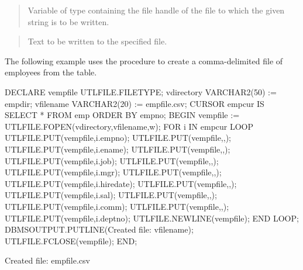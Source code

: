 \documentclass[letterpaper,10pt,english,openany,oneside]{sphinxmanual}
\begin{document}

\begin{quote}

Variable of type  containing the file handle of the file to
which the given string is to be written.
\end{quote}

\begin{quote}

Text to be written to the specified file.
\end{quote}

\newpage


The following example uses the  procedure to create a comma-delimited
file of employees from the  table.

%
\begin{sphinxVerbatim}[commandchars=\\\{\}]
DECLARE
    v\PYGZus{}empfile       UTL\PYGZus{}FILE.FILE\PYGZus{}TYPE;
    v\PYGZus{}directory     VARCHAR2(50) := \PYGZsq{}empdir\PYGZsq{};
    v\PYGZus{}filename      VARCHAR2(20) := \PYGZsq{}empfile.csv\PYGZsq{};
    CURSOR emp\PYGZus{}cur IS SELECT * FROM emp ORDER BY empno;
BEGIN
    v\PYGZus{}empfile := UTL\PYGZus{}FILE.FOPEN(v\PYGZus{}directory,v\PYGZus{}filename,\PYGZsq{}w\PYGZsq{});
    FOR i IN emp\PYGZus{}cur LOOP
        UTL\PYGZus{}FILE.PUT(v\PYGZus{}empfile,i.empno);
        UTL\PYGZus{}FILE.PUT(v\PYGZus{}empfile,\PYGZsq{},\PYGZsq{});
        UTL\PYGZus{}FILE.PUT(v\PYGZus{}empfile,i.ename);
        UTL\PYGZus{}FILE.PUT(v\PYGZus{}empfile,\PYGZsq{},\PYGZsq{});
        UTL\PYGZus{}FILE.PUT(v\PYGZus{}empfile,i.job);
        UTL\PYGZus{}FILE.PUT(v\PYGZus{}empfile,\PYGZsq{},\PYGZsq{});
        UTL\PYGZus{}FILE.PUT(v\PYGZus{}empfile,i.mgr);
        UTL\PYGZus{}FILE.PUT(v\PYGZus{}empfile,\PYGZsq{},\PYGZsq{});
        UTL\PYGZus{}FILE.PUT(v\PYGZus{}empfile,i.hiredate);
        UTL\PYGZus{}FILE.PUT(v\PYGZus{}empfile,\PYGZsq{},\PYGZsq{});
        UTL\PYGZus{}FILE.PUT(v\PYGZus{}empfile,i.sal);
        UTL\PYGZus{}FILE.PUT(v\PYGZus{}empfile,\PYGZsq{},\PYGZsq{});
        UTL\PYGZus{}FILE.PUT(v\PYGZus{}empfile,i.comm);
        UTL\PYGZus{}FILE.PUT(v\PYGZus{}empfile,\PYGZsq{},\PYGZsq{});
        UTL\PYGZus{}FILE.PUT(v\PYGZus{}empfile,i.deptno);
        UTL\PYGZus{}FILE.NEW\PYGZus{}LINE(v\PYGZus{}empfile);
    END LOOP;
    DBMS\PYGZus{}OUTPUT.PUT\PYGZus{}LINE(\PYGZsq{}Created file: \PYGZsq{} \textbar{}\textbar{} v\PYGZus{}filename);
    UTL\PYGZus{}FILE.FCLOSE(v\PYGZus{}empfile);
END;

Created file: empfile.csv
\end{sphinxVerbatim}
\end{document}
